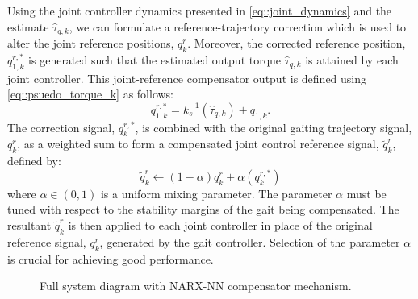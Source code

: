 			Using the joint controller dynamics presented in \ref{eq::joint_dynamics} and the estimate $\hat{\tau}_{q,k}$, we can formulate a reference-trajectory correction  which is used to alter the joint reference positions, ${q}_{k}^{r}$. Moreover, the corrected reference position, ${q}_{1,k}^{r,*}$ is generated such that the estimated output torque $\hat{\tau}_{q,k}$ is attained by each joint controller. This joint-reference compensator output is defined using 
			\ref{eq::psuedo_torque_k} as follows:
				\begin{equation}
				 	{q}_{1,k}^{r,*} 	= k_{s}^{-1}  \left(  \hat{\tau}_{q,k}  \right) +  {q}_{1,k}.
					\label{eq::correction_equation}
				\end{equation}
			The correction signal,  ${q}_{k}^{r,*}$, is combined with the original gaiting trajectory signal, ${q}_{k}^{r}$, as a weighted sum to form a compensated joint control reference signal, $\tilde{q}_{k}^{r}$, defined by:
				\begin{equation}
				 	\tilde{q}_{k}^{r} 	\leftarrow (1-\alpha) {q}_{k}^{r} + \alpha ( {q}_{k}^{r,*} )
					\label{eq::correction_application}
				\end{equation}
			where  $\alpha \in (0,1)$ is a uniform mixing parameter. The parameter $\alpha$ must be tuned with respect to the stability margins of the gait being compensated. The resultant $\tilde{q}_{k}^{r}$ is then applied  to each joint controller in place of the original reference signal,  ${q}_{k}^{r}$,  generated by the gait controller. Selection of the parameter $\alpha$ is crucial for achieving good performance. 

				\begin{figure}[h!]
					\centering
					\caption{Full system diagram with NARX-NN compensator mechanism.}
					\label{fig::sys_diagram}
				\end{figure}

